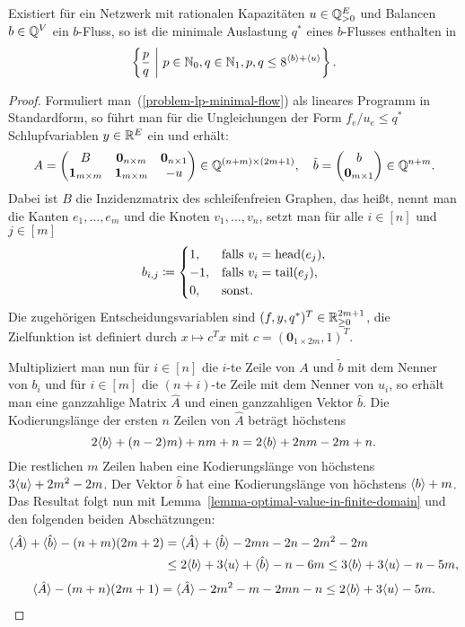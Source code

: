 \begin{corollary}\label{cor-minimal-congestion-limited}
	Existiert für ein Netzwerk mit rationalen Kapazitäten $u\in\mathbb{Q}_{>0}^E$ und Balancen $b\in\mathbb{Q}^V$ ein $b$-Fluss, so ist die minimale Auslastung $q^*$ eines $b$-Flusses enthalten in
	\[
	\left\{ \frac{p}{q} ~\middle|~ p\in\mathbb{N}_0, q\in\mathbb{N}_1, p,q \leq 8^{\langle b\rangle + \langle u\rangle } \right\}.
	\]
\end{corollary}
\begin{proof}
Formuliert man~(\ref{problem-lp-minimal-flow}) als lineares Programm in Standardform, so führt man für die Ungleichungen der Form $f_e/u_e \leq q^*$ Schlupfvariablen $y\in\mathbb{R}^E$ ein und erhält:
\newcommand{\nil}{\mathbf{0}}
\newcommand{\one}{\mathbf{1}}
\[
	A = \begin{pmatrix}
		B & \nil_{n\times m} & \nil_{n\times 1} \\
		\one_{m\times m} & \one_{m\times m} & -u
	\end{pmatrix} \in \Q^{(n+m) \times (2m+1)},~~~
	\tilde{b} = \begin{pmatrix}
		b \\
		\nil_{m\times 1}
	\end{pmatrix} \in \Q^{n+m}.
\]
Dabei ist $B$ die Inzidenzmatrix des schleifenfreien Graphen, das heißt, nennt man die Kanten $e_1, \dots, e_m $ und die Knoten $v_1, \dots, v_n$, setzt man für alle $i\in [n]$ und $j\in [m]$
\[ 
	b_{i,j} \coloneq \begin{cases}
		1, & \text{falls $v_i = \operatorname{head}(e_j)$}, \\
		-1, & \text{falls $v_i = \operatorname{tail}(e_j)$},\\
		0, & \text{sonst.}
	\end{cases}
\]
 Die zugehörigen Entscheidungsvariablen sind $(f, y, q^*)^T\in\mathbb{R}_{\geq 0}^{2m+1}$, die Zielfunktion ist definiert durch $x\mapsto c^T x$ mit $c = (\nil_{1\times 2m}, 1)^T$.
 
Multipliziert man nun für $i\in [n]$ die $i$-te Zeile von $A$ und $\tilde{b}$ mit dem Nenner von $b_i$ und für $i\in [m]$ die $(n+i)$-te Zeile mit dem Nenner von $u_i$, so erhält man eine ganzzahlige Matrix $\hat{A}$ und einen ganzzahligen Vektor $\hat{b}$.
Die Kodierungslänge der ersten $n$ Zeilen von $\hat{A}$ beträgt höchstens \[ 2\langle b\rangle + (n-2)m) + nm + n = 2\langle b\rangle + 2nm -2m + n.
\]
Die restlichen $m$ Zeilen haben eine Kodierungslänge von höchstens $3\langle u\rangle + 2m^2 - 2m$.
Der Vektor $\hat{b}$ hat eine Kodierungslänge von höchstens $\langle b\rangle + m$.
Das Resultat folgt nun mit Lemma~\ref{lemma-optimal-value-in-finite-domain} und den folgenden beiden Abschätzungen:
{\setlength{\abovedisplayskip}{9pt}%
	\setlength{\belowdisplayskip}{0pt}%
\begin{align*}
\langle\hat{A}\rangle + \langle\hat{b}\rangle - (n+m)(2m+2) &= \langle\hat{A}\rangle + \langle\hat{b}\rangle - 2mn - 2n - 2m^2 - 2m\\
&\leq 2 \langle b\rangle + 3\langle u\rangle + \langle\hat{b}\rangle - n - 6m \leq 3\langle b\rangle + 3\langle u\rangle -n-5m,
\end{align*}
\begin{align*}
\langle\hat{A}\rangle - (m+n)(2m + 1) = \langle\hat{A}\rangle - 2m^2 - m - 2mn - n \leq 2\langle b\rangle + 3\langle u\rangle - 5m.
\end{align*}
}
\end{proof}

